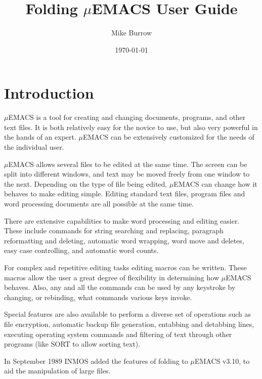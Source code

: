 \title{Folding $\mu$EMACS User Guide}
\author{Mike Burrow}
\date{\today}

\maketitle
\chapter{Introduction}

$\mu$EMACS is a tool for creating and changing documents, programs, and
other text files. It is both relatively easy for the novice to use, but
also very powerful in the hands of an expert. $\mu$EMACS can be
extensively customized for the needs of the individual user.

$\mu$EMACS allows several files to be edited at the same time. The
screen can be split into different windows, and text may be moved
freely from one window to the next. Depending on the type of file being
edited, $\mu$EMACS can change how it behaves to make editing simple.
Editing standard text files, program files and word processing
documents are all possible at the same time.

There are extensive capabilities to make word processing and editing
easier. These include commands for string searching and replacing,
paragraph reformatting and deleting, automatic word wrapping, word move
and deletes, easy case controlling, and automatic word counts.

For complex and repetitive editing tasks editing macros can be
written. These macros allow the user a great degree of flexibility in
determining how $\mu$EMACS behaves. Also, any and all the commands can
be used by any keystroke by changing, or rebinding, what commands
various keys invoke.

Special features are also available to perform a diverse set of
operations such as file encryption, automatic backup file generation,
entabbing and detabbing lines, executing operating system commands and
filtering of text through other programs (like SORT to allow sorting
text).

In September 1989 INMOS added the features of folding to $\mu$EMACS
v3.10, to aid the manipulation of large files.
